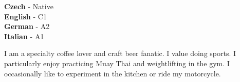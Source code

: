 \documentclass[9pt]{cv}
\begin{document}
\begin{minipage}[t]{0.3\textwidth}
	\vspace{-\baselineskip} %


	\textbf{Czech} - Native\\
	\textbf{English} - C1\\
	\textbf{German} - A2\\
	\textbf{Italian} - A1\\
\end{minipage}
\hfill
\begin{minipage}[t]{0.3\textwidth}
	\vspace{-\baselineskip} %
	

    I am a specialty coffee lover and craft beer fanatic. I value doing sports. I particularly enjoy practicing Muay Thai and weightlifting in the gym. I occasionally like to experiment in the kitchen or ride my motorcycle.
\end{minipage}
\hfill
% 	
% 	
\end{document}
